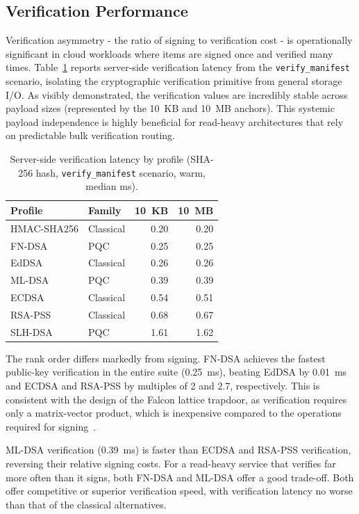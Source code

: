 \documentclass[12pt,a4paper]{article}
\begin{document}
\subsection{Verification Performance}
\label{sec:results:verify}

Verification asymmetry - the ratio of signing to verification cost - is operationally significant in cloud workloads where items are signed once and verified many times. Table~\ref{tab:verify_latency} reports server-side verification latency from the \texttt{verify\_manifest} scenario, isolating the cryptographic verification primitive from general storage I/O. As visibly demonstrated, the verification values are incredibly stable across payload sizes (represented by the 10~KB and 10~MB anchors). This systemic payload independence is highly beneficial for read-heavy architectures that rely on predictable bulk verification routing.

\begin{table}[H]
\centering
\caption[Server-side verification latency by profile]{Server-side verification latency by profile (SHA-256 hash, \texttt{verify\_manifest} scenario, warm, median ms).}
\label{tab:verify_latency}
\begin{tabular}{l l r r}
\toprule
Profile & Family & 10~KB & 10~MB \\
\midrule
HMAC-SHA256 & Classical & 0.20 & 0.20 \\
FN-DSA      & PQC       & 0.25 & 0.25 \\
EdDSA       & Classical & 0.26 & 0.26 \\
ML-DSA      & PQC       & 0.39 & 0.39 \\
ECDSA       & Classical & 0.54 & 0.51 \\
RSA-PSS     & Classical & 0.68 & 0.67 \\
SLH-DSA     & PQC       & 1.61 & 1.62 \\
\bottomrule
\end{tabular}
\end{table}

The rank order differs markedly from signing. FN-DSA achieves the fastest public-key verification in the entire suite (0.25~ms), beating EdDSA by 0.01~ms and ECDSA and RSA-PSS by multiples of 2 and 2.7, respectively. This is consistent with the design of the Falcon lattice trapdoor, as verification requires only a matrix-vector product, which is inexpensive compared to the operations required for signing~\cite{nist-fips206-2024}.

ML-DSA verification (0.39~ms) is faster than ECDSA and RSA-PSS verification, reversing their relative signing costs. For a read-heavy service that verifies far more often than it signs, both FN-DSA and ML-DSA offer a good trade-off. Both offer competitive or superior verification speed, with verification latency no worse than that of the classical alternatives.
\end{document}

